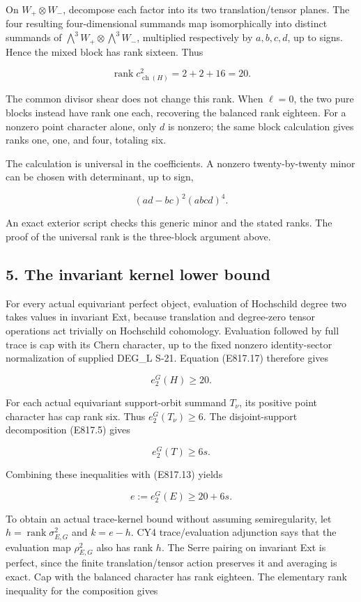 On \(W_+\otimes W_-\), decompose each factor into its two
translation/tensor planes. The four resulting four-dimensional summands
map isomorphically into distinct summands of
\(\bigwedge^3W_+\otimes\bigwedge^3W_-\), multiplied respectively by
\(a,b,c,d\), up to signs. Hence the mixed block has rank sixteen. Thus

\[
 \operatorname{rank}c^2_{\operatorname{ch}(H)}=2+2+16=20.
 \tag{E817.17}
\]

The common divisor shear does not change this rank. When \(\ell=0\), the
two pure blocks instead have rank one each, recovering the balanced rank
eighteen. For a nonzero point character alone, only \(d\) is nonzero;
the same block calculation gives ranks one, one, and four, totaling six.

The calculation is universal in the coefficients. A nonzero
twenty-by-twenty minor can be chosen with determinant, up to sign,

\[
 (ad-bc)^2(abcd)^4.
 \tag{E817.18}
\]

An exact exterior script checks this generic minor and the stated ranks.
The proof of the universal rank is the three-block argument above.

\subsection{5. The invariant kernel lower
bound}\label{SF-E817-the-invariant-kernel-lower-bound}

For every actual equivariant perfect object, evaluation of Hochschild
degree two takes values in invariant Ext, because translation and
degree-zero tensor operations act trivially on Hochschild cohomology.
Evaluation followed by full trace is cap with its Chern character, up to
the fixed nonzero identity-sector normalization of supplied DEG\_L S-21.
Equation (E817.17) therefore gives

\[
 e_2^G(H)\ge20.
 \tag{E817.19}
\]

For each actual equivariant support-orbit summand \(T_\nu\), its
positive point character has cap rank six. Thus \(e_2^G(T_\nu)\ge6\).
The disjoint-support decomposition (E817.5) gives

\[
 e_2^G(T)\ge6s.
 \tag{E817.20}
\]

Combining these inequalities with (E817.13) yields

\[
 e:=e_2^G(E)\ge20+6s.
 \tag{E817.21}
\]

To obtain an actual trace-kernel bound without assuming semiregularity,
let \(h=\operatorname{rank}\sigma^2_{E,G}\) and \(k=e-h\). CY4
trace/evaluation adjunction says that the evaluation map
\(\rho^2_{E,G}\) also has rank \(h\). The Serre pairing on invariant Ext
is perfect, since the finite translation/tensor action preserves it and
averaging is exact. Cap with the balanced character has rank eighteen.
The elementary rank inequality for the composition gives

